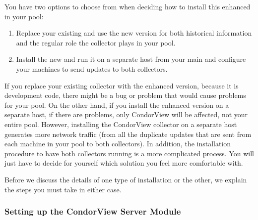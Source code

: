 You have two options to choose from when deciding how to install this
enhanced  in your pool:
\begin{enumerate}
\item Replace your existing  and use the new
version for both historical information and the regular role the 
collector plays in your pool.
\item Install the new  and run it on a separate host
from your main  and configure your machines to send
updates to both collectors.
\end{enumerate}

If you replace your existing collector with the enhanced version,
because it is development code, there might be a bug or problem that
would cause problems for your pool.
On the other hand, if you install the enhanced version on a separate
host, if there are problems, only CondorView will be affected, not
your entire pool.
However, installing the CondorView collector on a separate host
generates more network traffic (from all the duplicate updates that
are sent from each machine in your pool to both collectors).
In addition, the installation procedure to have both collectors
running is a more complicated process.
You will just have to decide for yourself which solution you feel more
comfortable with.

Before we discuss the details of one type of installation or the
other, we explain the steps you must take in either case.

\subsubsection{\label{sec:CondorView-Server-Setup}
Setting up the CondorView Server Module} 


